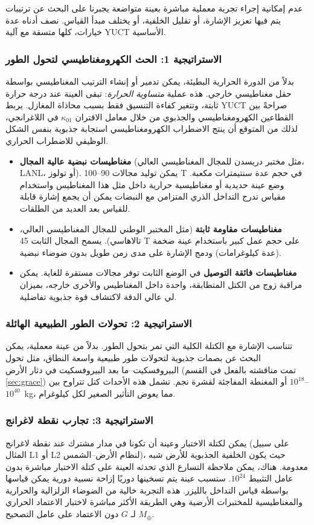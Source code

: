 \documentclass[11pt,a4paper]{article}
\begin{document}
	عدم إمكانية إجراء تجربة معملية مباشرة بعينة متواضعة يجبرنا على البحث عن ترتيبات يتم فيها تعزيز الإشارة، أو تقليل الخلفية، أو يختلف مبدأ القياس. نصف أدناه عدة خيارات، كلها متسقة مع آلية YUCT الأساسية.
	
	\subsubsection*{الاستراتيجية 1: الحث الكهرومغناطيسي لتحول الطور}
	بدلاً من الدورة الحرارية البطيئة، يمكن تدمير أو إنشاء الترتيب المغناطيسي بواسطة حقل مغناطيسي خارجي. هذه عملية \emph{متساوية الحرارة}: تبقى العينة عند درجة حرارة ثابتة، وتتغير كفاءة التنسيق فقط بسبب محاذاة المغازل. يربط YUCT صراحةً بين القطاعين الكهرومغناطيسي والجذبوي من خلال معامل الاقتران $\kappa_{01}$ في اللاغرانجي، لذلك من المتوقع أن ينتج الاضطراب الكهرومغناطيسي استجابة جذبوية بنفس الشكل الوظيفي للاضطراب الحراري.
	
	\begin{itemize}
		\item \textbf{مغناطيسات نبضية عالية المجال} (مثل مختبر دريسدن للمجال المغناطيسي العالي، LANL، أو تولوز). يمكن توليد مجالات 90–100 T في حجم عدة سنتيمترات مكعبة. وضع عينة حديدية أو مغناطيسية حرارية داخل مثل هذا المغناطيس واستخدام مقياس تدرج التداخل الذري المتزامن مع النبضات يمكن أن يجمع إشارة قابلة للقياس بعد العديد من الطلقات.
		\item \textbf{مغناطيسات مقاومة ثابتة} (مثل المختبر الوطني للمجال المغناطيسي العالي، تالاهاسي). يسمح المجال الثابت 45 T على حجم عمل كبير باستخدام عينة ضخمة (عدة كيلوغرامات) ودمج الإشارة على مدى زمن طويل بدون ضوضاء نبضية.
		\item \textbf{مغناطيسات فائقة التوصيل} في الوضع الثابت توفر مجالات مستقرة للغاية. يمكن مراقبة زوج من الكتل المتطابقة، واحدة داخل المغناطيس والأخرى خارجه، بميزان لي عالي الدقة لاكتشاف قوة جذبوية تفاضلية.
	\end{itemize}
	
	\subsubsection*{الاستراتيجية 2: تحولات الطور الطبيعية الهائلة}
	تتناسب الإشارة مع الكتلة الكلية التي تمر بتحول الطور. بدلاً من عينة معملية، يمكن البحث عن بصمات جذبوية لتحولات طور طبيعية واسعة النطاق، مثل تحول البيروفسكيت–ما بعد البيروفسكيت في دثار الأرض (تمت مناقشته بالفعل في القسم \ref{sec:grace}) أو المغنطة المفاجئة لقشرة نجم. تشمل هذه الأحداث كتل تتراوح بين $10^{18}$–$10^{40}$~kg، مما يعوض التأثير الصغير لكل كيلوغرام.
	
	\subsubsection*{الاستراتيجية 3: تجارب نقطة لاغرانج}
	يمكن لكتلة الاختبار وعينة أن تكونا في مدار مشترك عند نقطة لاغرانج (على سبيل المثال L1 أو L2 لنظام الأرض–الشمس)، حيث يكون الخلفية الجذبوية للأرض شبه معدومة. هناك، يمكن ملاحظة التسارع الذي تحدثه العينة على كتلة الاختبار مباشرة بدون عامل التثبيط $10^{24}$. ستسبب عينة يتم تسخينها دوريًا إزاحة نسبية دورية يمكن قياسها بواسطة قياس التداخل بالليزر. هذه التجربة خالية من الضوضاء الزلزالية والحرارية والمغناطيسية للمختبرات الأرضية وهي الطريقة الأكثر مباشرة لاختبار الاعتماد الحراري لـ $G$ دون الاعتماد على عامل التصحيح $M_\oplus$.
	
\end{document}
